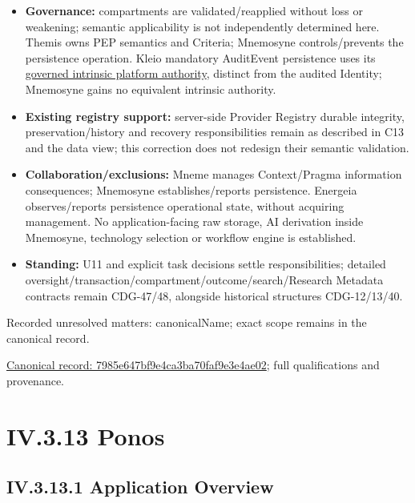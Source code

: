 \begin{itemize}
\item \textbf{Governance:} compartments are validated/reapplied without loss or weakening;
  semantic applicability is not independently determined here. Themis owns PEP
  semantics and Criteria; Mnemosyne controls/prevents the persistence operation.
  Kleio mandatory AuditEvent persistence uses its
  \href{\detokenize{../../../../../docs/markdown/05-information-systems-architecture/component-register.md#kleio-capture-authority}}{governed intrinsic platform authority}, distinct
  from the audited Identity; Mnemosyne gains no equivalent intrinsic authority.

\item \textbf{Existing registry support:} server-side Provider Registry durable integrity,
  preservation/history and recovery responsibilities remain as described in C13
  and the data view; this correction does not redesign their semantic validation.

\item \textbf{Collaboration/exclusions:} Mneme manages Context/Pragma information consequences;
  Mnemosyne establishes/reports persistence. Energeia observes/reports persistence
  operational state, without acquiring management. No application-facing raw storage,
  AI derivation inside Mnemosyne, technology selection or workflow engine is established.

\item \textbf{Standing:} U11 and explicit task decisions settle responsibilities; detailed
  oversight/transaction/compartment/outcome/search/Research Metadata contracts remain
  CDG-47/48, alongside historical structures CDG-12/13/40.

\end{itemize}

{\small Recorded unresolved matters: canonicalName; exact scope remains in the canonical record.}\par
{\footnotesize \href{../../../../continuum/application/application-component/7985e647bf9e4ca3ba70faf9e3e4ae02.md}{Canonical record: 7985e647bf9e4ca3ba70faf9e3e4ae02}; full qualifications and provenance.}\par
\section*{IV.3.13 Ponos}
\label{navigation:IV.3.13}

\subsection*{IV.3.13.1 Application Overview}
\label{navigation:IV.3.13.1}

